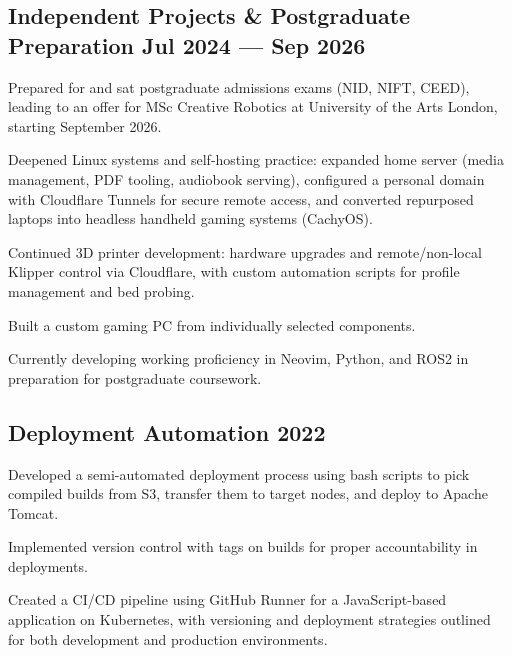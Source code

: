 \subsection{\texorpdfstring{Independent Projects \& Postgraduate Preparation \hfill Jul 2024 --- Sep 2026}{Independent Projects and Postgraduate Preparation, Jul 2024 - Sep 2026}}
\begin{zitemize}
\item Prepared for and sat postgraduate admissions exams (NID, NIFT, CEED), leading to an offer for MSc Creative Robotics at University of the Arts London, starting September 2026.
\item Deepened Linux systems and self-hosting practice: expanded home server (media management, PDF tooling, audiobook serving), configured a personal domain with Cloudflare Tunnels for secure remote access, and converted repurposed laptops into headless handheld gaming systems (CachyOS).
\item Continued 3D printer development: hardware upgrades and remote/non-local Klipper control via Cloudflare, with custom automation scripts for profile management and bed probing.
\item Built a custom gaming PC from individually selected components.
\item Currently developing working proficiency in Neovim, Python, and ROS2 in preparation for postgraduate coursework.
\end{zitemize}

\subsection{\texorpdfstring{Deployment Automation \hfill 2022}{Deployment Automation - 2022}}
\begin{zitemize}
\item Developed a semi-automated deployment process using bash scripts to pick compiled builds from S3, transfer them to target nodes, and deploy to Apache Tomcat.
\item Implemented version control with tags on builds for proper accountability in deployments.
\item Created a CI/CD pipeline using GitHub Runner for a JavaScript-based application on Kubernetes, with versioning and deployment strategies outlined for both development and production environments.
\end{zitemize}

